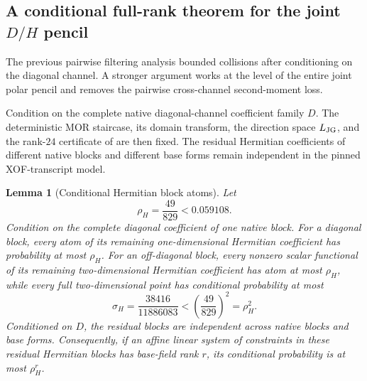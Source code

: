\documentclass[11pt]{article}
\newtheorem{lemma}[theorem]{Lemma}
\begin{document}
\subsection{A conditional full-rank theorem for the joint $D/H$ pencil}
\label{sec:jg-joint-pencil}

The previous pairwise filtering analysis bounded collisions after conditioning
on the diagonal channel.  A stronger argument works at the level of the
entire joint polar pencil and removes the pairwise cross-channel second-moment
loss.

Condition on the complete native diagonal-channel coefficient family $D$.
The deterministic MOR staircase, its domain transform, the direction space
$L_{\rm JG}$, and the rank-$24$ certificate of
 are then fixed.  The residual Hermitian coefficients of
different native blocks and different base forms remain independent in the
pinned XOF-transcript model.

\begin{lemma}[Conditional Hermitian block atoms]
\label{lem:jg-block-atoms}
Let
\[
  \rho_H=\frac{49}{829}<0.059108.
\]
Condition on the complete diagonal coefficient of one native block.  For a
diagonal block, every atom of its remaining one-dimensional Hermitian
coefficient has probability at most $\rho_H$.  For an off-diagonal block,
every nonzero scalar functional of its remaining two-dimensional Hermitian
coefficient has atom at most $\rho_H$, while every full two-dimensional point
has conditional probability at most
\begin{equation}
  \sigma_H=\frac{38416}{11886083}
  <\left(\frac{49}{829}\right)^2=\rho_H^2.
  \label{eq:jg-joint-block-atom}
\end{equation}
Conditioned on $D$, the residual blocks are independent across native blocks
and base forms.  Consequently, if an affine linear system of constraints in
these residual Hermitian blocks has base-field rank $r$, its conditional
probability is at most $\rho_H^r$.
\end{lemma}
\end{document}

